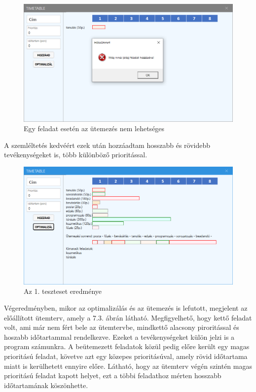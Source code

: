 \begin{figure}[h]
	\centering
	\includegraphics[scale=0.6]{images/test/notEnoughTasks.png}
	\caption{Egy feladat esetén az ütemezés nem lehetséges}
\end{figure}

A szemléltetés kedvéért ezek után hozzáadtam hosszabb és rövidebb tevékenységeket is, több különböző prioritással. 

\begin{figure}[h]
	\centering
	\includegraphics[scale=0.6]{images/test/result1.png}
	\caption{Az 1. teszteset eredménye}
\end{figure}

Végeredményben, mikor az optimalizálás és az ütemezés is lefutott, megjelent az előállított ütemterv, amely a 7.3. ábrán látható. Megfigyelhető, hogy kettő feladat volt, ami már nem fért bele az ütemtervbe, mindkettő alacsony piroritással és hoszabb időtartammal rendelkezve. Ezeket a tevékenységeket külön jelzi is a program számunkra. A beütemezett feladatok közül pedig előre került egy magas prioritású feladat, követve azt egy közepes prioritásúval, amely rövid időtartama miatt is kerülhetett ennyire előre. Látható, hogy az ütemterv végén szintén magas prioritású feladat kapott helyet, ezt a többi feladathoz mérten hosszabb időtartamának köszönhette.

